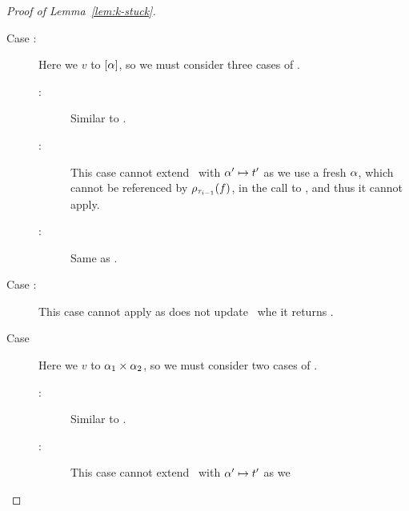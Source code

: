 \begin{proof}[Proof of Lemma~\ref{lem:k-stuck}]
\begin{description}
    \item[Case :]
      Here we \forcesym $v$ to $[\alpha]$,
      so we must consider three cases of \forcesym.
      \begin{description}
      \item[:]
        Similar to \replusgood.
      \item[:]
        This case cannot extend \tsu\ with $\alpha' \mapsto t'$ as we
        use a fresh $\alpha$, which cannot be referenced by
        $\rho_{\tau_{i-1}}(f)$, in the call to \forcesym, and thus it
        cannot apply.
      \item[:]
        Same as .
      \end{description}
    \item[Case \recasebad:]
      This case cannot apply as \forcesym does not update \tsu\ whe
      it returns \stuck.
    \item[Case \repcasegood]
      Here we \forcesym $v$ to $\alpha_1 \times \alpha_2$,
      so we must consider two cases of \forcesym.
      \begin{description}
      \item[:]
        Similar to \replusgood.
      \item[:]
        This case cannot extend \tsu\ with $\alpha' \mapsto t'$ as we

\end{description}
\end{description}
\end{proof}
